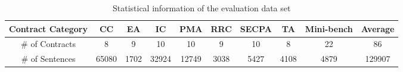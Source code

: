 \begin{table*}[t]
    \centering
    \caption{Statistical information of the evaluation data set} 
    \begin{tabular}{@{}c|cccccccc|c@{}}
    \toprule
    \textbf{Contract Category} & \textbf{CC} & \textbf{EA} & \textbf{IC} & \textbf{PMA} & \textbf{RRC} & \textbf{SECPA} & \textbf{TA} & \textbf{Mini-bench} & \textbf{Average} \\ \hline
    # of Contracts          & 8    & 9     & 10   & 10      & 9    & 10       & 8    & 22             & 86         \\
    # of Sentences       & 65080    & 1702    & 32924     & 12749   & 3038 & 5427     & 4108        & 4879     & 129907        \\ \bottomrule
    \end{tabular}
    \label{tab:evaluationSetInfo}
\end{table*}